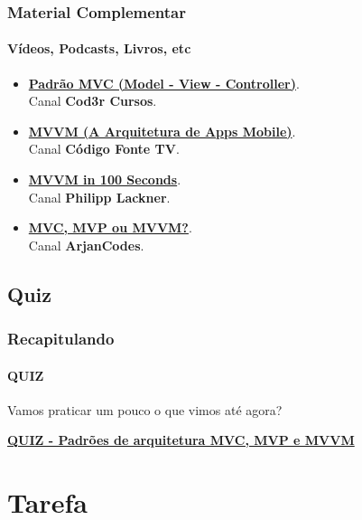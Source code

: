 \documentclass[
	10pt, %
	t, %
]{beamer}
\newcommand{\iconLink}[2]{\href{#1}{\faLink \hspace{0.2em} {#2}}}
\begin{document}
\begin{frame}
	\frametitle{Material Complementar}
	\framesubtitle{Vídeos, Podcasts, Livros, etc}
	
	\begin{itemize}
		\item \iconLink{https://youtu.be/mMDt9g7bMjk}{\textbf{Padrão MVC (Model - View - Controller)}}.\\Canal \textbf{Cod3r Cursos}.\\
		\item \iconLink{https://youtu.be/B2pJWtSyVFA}{\textbf{MVVM (A Arquitetura de Apps Mobile)}}.\\Canal \textbf{Código Fonte TV}.\\
		\item \iconLink{https://www.youtube.com/watch?v=-xTqfilaYow}{\textbf{MVVM in 100 Seconds}}.\\Canal \textbf{Philipp Lackner}.\\
		\item \iconLink{https://www.youtube.com/watch?v=eHhXoCNCI1c}{\textbf{MVC, MVP ou MVVM?}}.\\Canal \textbf{ArjanCodes}.\\
	\end{itemize}
	
\end{frame}

\subsection{Quiz}

\begin{frame}
	\frametitle{Recapitulando}
	\framesubtitle{QUIZ}

	Vamos praticar um pouco o que vimos até agora?
	\vfill

	\bigskip
	\centering

	\iconLink{https://quizizz.com/admin/quiz/659d7e449a88c830fdf1801c?source=quiz_share}{\textbf{QUIZ - Padrões de arquitetura MVC, MVP e MVVM}}
	\vfill
		
\end{frame}


\section{Tarefa}
\end{document}
